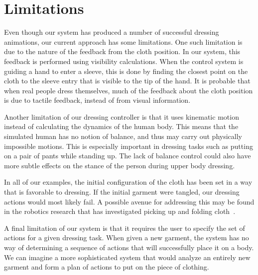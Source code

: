 \section{Limitations}

Even though our system has produced a number of successful dressing
animations, our current approach has some limitations.  One such
limitation is due to the nature of the feedback from the cloth position.
In our system, this feedback is performed using visibility calculations.
When the control system is guiding a hand to enter a sleeve, this is done
by finding the closest point on the cloth to the sleeve entry that is
visible to the tip of the hand.  It is probable that when real people
dress themselves, much of the feedback about the cloth position is due
to tactile feedback, instead of from visual information.

Another limitation of our dressing controller is that it uses kinematic
motion instead of calculating the dynamics of the human body.  This means
that the simulated human has no notion of balance, and thus may carry out
physically impossible motions.  This is especially important in dressing
tasks such as putting on a pair of pants while standing up.  The lack of
balance control could also have more subtle effects on the stance of the
person during upper body dressing.

In all of our examples, the initial configuration of the cloth has been
set in a way that is favorable to dressing.  If the initial garment were
tangled, our dressing actions would most likely fail.  A possible avenue
for addressing this may be found in the robotics research that has
investigated picking up and folding cloth~\cite{Cusumano:2011:BCD}.

A final limitation of our system is that it requires the user to specify
the set of actions for a given dressing task.  When given a new garment,
the system has no way of determining a sequence of actions that will
successfully place it on a body.  We can imagine a more sophisticated
system that would analyze an entirely new garment and form a plan of
actions to put on the piece of clothing.  

